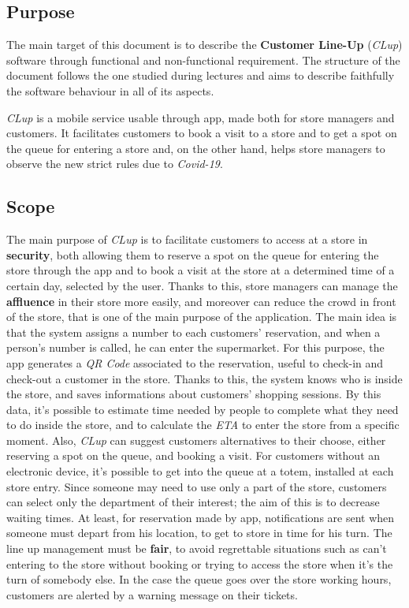 \documentclass{article}
\begin{document}
	\subsection{Purpose}
	
	The main target of this document is to describe the {\bfseries Customer Line-Up} (\emph{CLup}) software through functional and non-functional requirement. The structure of the document follows the one studied during lectures and aims to describe faithfully the software behaviour in all of its aspects.
	
	\emph{CLup} is a mobile service usable through app, made both for store managers and customers. It facilitates customers to book a visit to a store and to get a spot on the queue for entering a store and, on the other hand, helps store managers to observe the new strict rules due to \emph{Covid-19}.
	
	\subsection{Scope}
	
	The main purpose of \emph{CLup} is to facilitate customers to access at a store in {\bfseries security}, both allowing them to reserve a spot on the queue for entering the store through the app and to book a visit at the store at a determined time of a certain day, selected by the user. Thanks to this, store managers can manage the {\bfseries affluence} in their store more easily, and moreover can reduce the crowd in front of the store, that is one of the main purpose of the application. The main idea is that the system assigns a number to each customers' reservation, and when a person's number is called, he can enter the supermarket. For this purpose, the app generates a \emph{QR Code} associated to the reservation, useful to check-in and check-out a customer in the store. Thanks to this, the system knows who is inside the store, and saves informations about customers' shopping sessions. By this data, it's possible to estimate time needed by people to complete what they need to do inside the store, and to calculate the \emph{ETA} to enter the store from a specific moment. Also, \emph{CLup} can suggest customers alternatives to their choose, either reserving a spot on the queue, and booking a visit. For customers without an electronic device, it's possible to get into the queue at a totem, installed at each store entry. Since someone may need to use only a part of the store, customers can select only the department of their interest; the aim of this is to decrease waiting times. At least, for reservation made by app, notifications are sent when someone must depart from his location, to get to store in time for his turn. The line up management must be {\bfseries fair}, to avoid regrettable situations such as can't entering to the store without booking or trying to access the store when it's the turn of somebody else. In the case the queue goes over the store working hours, customers are alerted by a warning message on their tickets.
\end{document}
